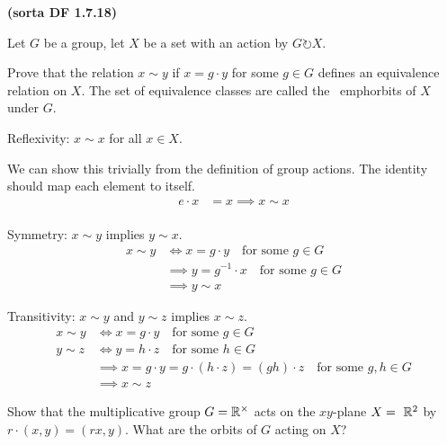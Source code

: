 

\begin{problem} \textbf{\textsf{(sorta DF 1.7.18)}}

  \noindent
  Let $G$ be a group, let $X$ be a set with an action by $G \circlearrowright X$.  
  \begin{enumalph}
    \item Prove that the relation $x \sim y$ if $x=g\cdot y$ for some $g \in G$ defines
    an equivalence relation on $X$.  The set of equivalence classes are called the \
    emph{orbits} of $X$ under $G$.
    \begin{Answer}
      \begin{enumroman}
        \item Reflexivity: $x \sim x$ for all $x \in X$.
        
          We can show this trivially from the definition of group actions.
          The identity should map each element to itself.
          \begin{align*}
            e \cdot x &= x \implies x \sim x \\
          \end{align*}
        \item Symmetry: $x \sim y$ implies $y \sim x$.
        \begin{align*}
          x \sim y &\iff x = g\cdot y \quad \text{for some $g \in G$} \\
          &\implies y = g^{-1}\cdot x \quad \text{for some $g \in G$} \\
          &\implies y \sim x
        \end{align*}
        \item Transitivity: $x \sim y$ and $y \sim z$ implies $x \sim z$.
        \begin{align*}
          x \sim y &\iff x = g\cdot y \quad \text{for some $g \in G$} \\
          y \sim z &\iff y = h\cdot z \quad \text{for some $h \in G$} \\
          &\implies x = g\cdot y = g\cdot (h\cdot z) = (gh)\cdot z \quad \text{for some $g,h \in G$} \\
          &\implies x \sim z
        \end{align*}
      \end{enumroman}
    \end{Answer}
    \item Show that the multiplicative group $G=\mathbb{R}^\times$ acts on the $xy$-plane $X=\
    \mathbb{R}^2$ by $r \cdot (x,y) = (rx,y)$.  What are the orbits of $G$ acting on $X$?  

\end{enumalph}
\end{problem}
